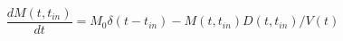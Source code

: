 \begin{equation}
\frac{d M(t,t_{in})}{dt} = M_0 \delta(t-t_{in}) - M(t,t_{in})D(t,t_{in})/V(t)
\end{equation}